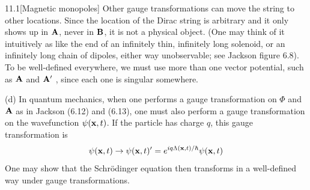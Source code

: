 \documentclass[12pt]{article}
\begin{document}
\begin{problem}{11.1}[Magnetic monopoles]
Other gauge transformations can move the string to other locations. Since the
location of the Dirac string is arbitrary and it only shows up in $\vb{A}$,
never in $\vb{B}$, it is not a physical object. (One may think of it
intuitively as like the end of an infinitely thin, infinitely long solenoid,
or an infinitely long chain of dipoles, either way unobservable; see Jackson
figure 6.8). To be well-defined everywhere, we must use more than one vector
potential, such as $\vb{A}$ and $\vb{A}'$ , since each one is singular
somewhere.    

(d) In quantum mechanics, when one performs a gauge transformation on $\Phi$ and
$\vb{A}$ as in Jackson (6.12) and (6.13), one must also perform a gauge
transformation on the wavefunction $\psi(\vb{x},t)$. If the particle has charge
$q$, this gauge transformation is
\begin{equation}
    \psi(\vb{x},t)\to\psi(\vb{x},t)'=e^{iq\Lambda(\vb{x},t)/\hbar}\psi(\vb{x},t) 
\end{equation}
One may show that the Schr\"{o}dinger equation then transforms in a well-defined
way under gauge transformations.


\end{problem}
\end{document}
